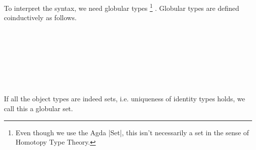 

To interpret the syntax, we need globular types
\footnote{Even though we use the Agda |Set|, this isn't necessarily a set in the sense of Homotopy Type Theory.}
. Globular types are defined coinductively as follows.

\begin{code}\>\<%
\\
\>  \AgdaSymbol{:}  \<%
\\
\>[0]\<[2]%
\>[2] \<%
\\
\>[0]\<[2]%
\>[2]\<%
\\
\>[2]\<[4]%
\>[4] \<[10]%
\>[10]\AgdaSymbol{:} \<%
\\
\>[2]\<[4]%
\>[4] \<[9]%
\>[9]\AgdaSymbol{:}      \<%
\\
\>\<\end{code}

If all the object types are indeed sets, i.e. uniqueness of identity types holds, we call this a globular set.

